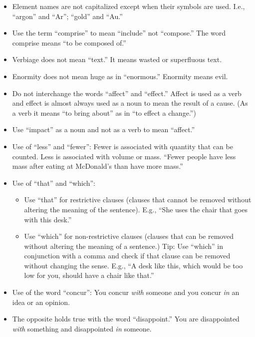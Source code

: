\begin{itemize}
\item Element names are not capitalized except when their symbols are used. I.e., ``argon'' and ``Ar''; ``gold'' and ``Au.''
\item Use the term ``comprise'' to mean ``include'' not ``compose.'' The word comprise means ``to be composed of.''
\item Verbiage does not mean ``text.'' It means wasted or superfluous text.
\item Enormity does not mean huge as in ``enormous.'' Enormity means evil.
\item Do not interchange the words ``affect'' and ``effect.'' Affect is used as a verb and effect is almost always used as a noun to mean the result of a cause. (As a verb it means ``to bring about'' as in ``to effect a change.'') 
\item Use ``impact'' as a noun and not as a verb to mean ``affect.''
\item Use of ``less'' and ``fewer'': Fewer is associated with quantity that can be counted. Less is associated with volume or mass. ``Fewer people have less mass after eating at McDonald's than have more mass.''
\item Use of ``that'' and ``which'': 
\begin{itemize}
\item Use ``that'' for restrictive clauses (clauses that cannot be removed without altering the meaning of the sentence). E.g., ``She uses the chair that goes with this desk.''
\item Use ``which'' for non-restrictive clauses (clauses that can be removed without altering the meaning of a sentence.) Tip: Use ``which'' in conjunction with a comma and check if that clause can be removed without changing the sense.  E.g., ``A desk like this, which would be too low for you, should have a chair like that.''
\end{itemize}
\item Use of the word ``concur'': You concur \emph{with} someone and you concur \emph{in} an idea or an opinion. 
\item The opposite holds true with the word ``disappoint.'' You are disappointed \emph{with} something and disappointed \emph{in} someone.
\end{itemize}



